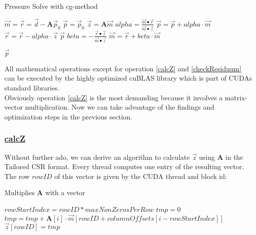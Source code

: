 \begin{algorithm}
\caption{Pressure Solve with cg-method}\label{pressure-solve-cg}
\begin{algorithmic}[1]
	\State $\vec{m} = \vec{r} = \vec{d} - \mathbf{A} \vec{p}_{0}$ 
	\State $\vec{p} = \vec{p}_{0}$
		\State $\vec{z} = \mathbf{A} \vec{m}$ \label{calcZ} 
		\State $alpha = \frac{\vec{m} \bullet \vec{r}}{\vec{m} \bullet \vec{z}}$
		\State $\vec{p} = \vec{p} + alpha \cdot \vec{m}$
		\State $\vec{r} = \vec{r} - alpha \cdot \vec{z}$
		 \label{checkResiduum}  
			\State \Return $\vec{p}$
		\EndIf
		\State $beta = - \frac{\vec{r} \bullet \vec{z}}{\vec{m} \bullet \vec{z}}$
		\State $\vec{m} = \vec{r} + beta \cdot \vec{m}$
	\EndFor

\State \Return $\vec{p}$
\EndFunction
\end{algorithmic}
\end{algorithm}
All mathematical operations except for operation \ref{calcZ} and \ref{checkResiduum} can be executed by the highly optimized cuBLAS library which is part of CUDAs standard libraries. \\
Obviously operation \ref{calcZ} is the most demanding because it involves a matrix-vector multiplication. Now we can take advantage of the findings and optimization steps in the previous section. 


\subsubsection{\hyperref[calcZ]{calcZ}}
Without further ado, we can derive an algorithm to calculate $\vec{z}$ using \textbf{A} in the Tailored CSR format. Every thread computes one entry of the resulting vector. The row $rowID$ of this vector is given by the CUDA thread and block id:
\begin{algorithm}
\caption{Multiplies \textbf{A} with a vector}\label{pressure-solve-calc-z}
\begin{algorithmic}[1]
		\State $rowStartIndex = rowID * maxNonZerosPerRow$ 
		\State $tmp = 0$ 
			\State $tmp = tmp + \mathbf{A}[i] \cdot \vec{m}[rowID + columnOffsets[i - rowStartIndex]]$
		\EndFor
		\State $\vec{z}[rowID] = tmp$
	\EndIf
\EndFunction
\end{algorithmic}
\end{algorithm}

